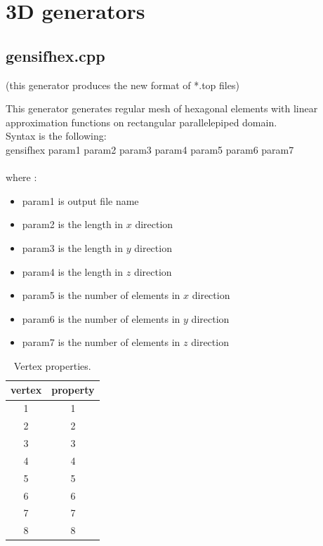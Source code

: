\documentclass[12pt]{book}
\begin{document}
\section {3D generators}

\subsection {gensifhex.cpp}

(this generator produces the new format of *.top files)

This generator generates regular mesh of hexagonal elements with linear approximation functions
on rectangular parallelepiped domain.
\\
Syntax is the following:
\\
gensifhex param1 param2 param3 param4 param5 param6 param7\\
\\
where :\\
\begin{itemize}
\item param1 is output file name
\item param2 is the length in  $x$ direction
\item param3 is the length in  $y$ direction
\item param4 is the length in  $z$ direction
\item param5 is the number of elements in $x$ direction
\item param6 is the number of elements in $y$ direction
\item param7 is the number of elements in $z$ direction
\end{itemize}

\begin{table}
\begin{center}
\begin{tabular}{|c|c|}
\hline
vertex & property
\\ \hline
1 & 1
\\ \hline
2 & 2
\\ \hline
3 & 3
\\ \hline
4 & 4
\\ \hline
5 & 5
\\ \hline
6 & 6
\\ \hline
7 & 7
\\ \hline
8 & 8
\\ \hline
\end{tabular}
\caption{Vertex properties.}
\end{center}
\end{table}
\end{document}
